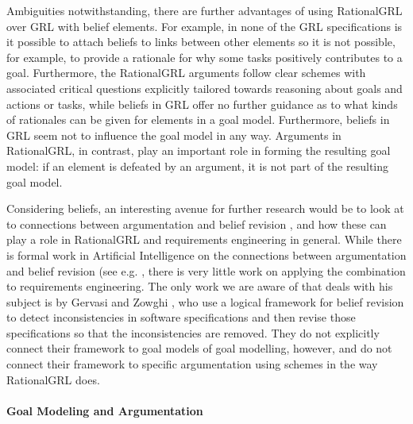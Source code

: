 Ambiguities notwithstanding, there are further advantages of using RationalGRL over GRL with belief elements. For example, in none of the GRL specifications is it possible to attach beliefs to links between other elements so it is not possible, for example, to provide a rationale for why some tasks positively contributes to a goal. Furthermore, the RationalGRL arguments follow clear schemes with associated critical questions explicitly tailored towards reasoning about goals and actions or tasks, while beliefs in GRL offer no further guidance as to what kinds of rationales can be given for elements in a goal model. Furthermore, beliefs in GRL seem not to influence the goal model in any way. Arguments in RationalGRL, in contrast, play an important role in forming the resulting goal model: if an element is defeated by an argument, it is not part of the resulting goal model.

Considering beliefs, an interesting avenue for further research would be to look at to connections between argumentation and belief revision \cite{alchourron1985logic}, and how these can play a role in RationalGRL and requirements engineering in general. While there is formal work in Artificial Intelligence on the connections between argumentation and belief revision (see e.g. \cite{falappa2009belief}, there is very little work on applying the combination to requirements engineering. The only work we are aware of that deals with his subject is by Gervasi and Zowghi \cite{gervasi2005reasoning}, who use a logical framework for belief revision to detect inconsistencies in software specifications and then revise those specifications so that the inconsistencies are removed. They do not explicitly connect their framework to goal models of goal modelling, however, and do not connect their framework to specific argumentation using schemes in the way RationalGRL does. 

\paragraph{Goal Modeling and Argumentation}

